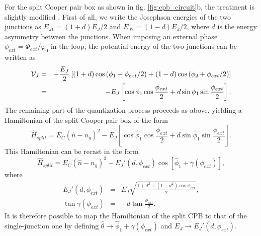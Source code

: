 For the split Cooper pair box as shown in fig. \ref{fig:cpb_circuit}b, the treatment is slightly modified \citep{cottet_implementation_2002}. First of all, we write the Josephson energies of the two junctions as $E_{J1}=(1+d)E_J/2$ and $E_{J2}=(1-d)E_J/2$, where $d$ is the energy asymmetry between the junctions. When imposing an external phase $\phi_{ext}=\Phi_{ext}/\varphi_0$ in the loop, the potential energy of the two junctions can be written as
%
\begin{eqnarray}
\begin{mathcal}V\end{mathcal}_J & = & -\frac{E_J}{2}\left[(1+d)\cos{(\phi_1-\phi_{ext}/2)}+(1-d)\cos{(\phi_2+\phi_{ext}/2)} \right] \\
& = & -E_J\left[\cos{\phi_1}\cos{\frac{\phi_{ext}}{2}}+d\sin{\phi_1}\sin{\frac{\phi_{ext}}{2}}\right].
\end{eqnarray}
%
The remaining part of the quantization process proceeds as above, yielding a Hamiltonian of the split Cooper pair box of the form
%
\begin{equation}
\hat{H}_{split} = E_C(\hat{n}-n_g)^2-E_J\left[\cos{\hat{\phi}_1}\cos{\frac{\phi_{ext}}{2}}+d\sin{\hat{\phi}_1}\sin{\frac{\phi_{ext}}{2}}\right].
\end{equation}
%
This Hamiltonian can be recast in the form \citep{cottet_implementation_2002}
%
\begin{equation}
\hat{H}_{split} = E_C(\hat{n}-n_g)^2-E_J'(d,\phi_{ext})\cos{[\hat{\phi}_1+\gamma(\phi_{ext})]},
\end{equation}
%
where
%
\begin{eqnarray}
E_J'(d,\phi_{ext}) & = & E_J\sqrt{\frac{1+d^2+(1-d^2)\cos{\phi_{ext}}}{2}}, \\
\tan{\gamma(\phi_{ext})} & = & -d\tan{\frac{\phi_{ext}}{2}}. \label{eq:josephson_energy_modulation}
\end{eqnarray}
%
It is therefore possible to map the Hamiltonian of the split CPB to that of the single-junction one by defining $\hat{\theta}\to\hat{\phi}_1+\gamma(\phi_{ext})$ and $E_J\to E_J'(d,\phi_{ext})$. 

